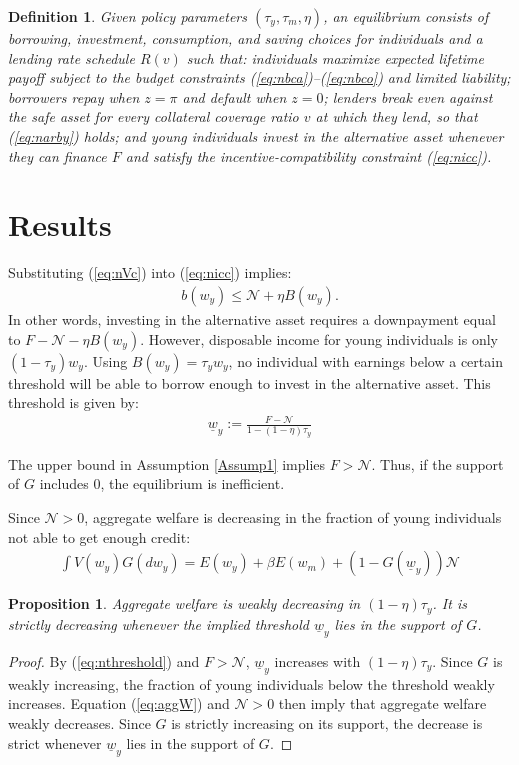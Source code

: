 \documentclass[draft,pdftex,nolinenumbers,noinfoline]{article}
\theoremstyle{plain}
\newtheorem{prp}{Proposition}
\newtheorem{dfn}{Definition}
\begin{document}
\begin{dfn}
Given policy parameters $(\tau_y,\tau_m,\eta)$, an equilibrium consists of borrowing, investment, consumption, and saving choices for individuals and a lending rate schedule $R(v)$ such that: individuals maximize expected lifetime payoff subject to the budget constraints (\ref{eq:nbca})--(\ref{eq:nbco}) and limited liability; borrowers repay when $z=\pi$ and default when $z=0$; lenders break even against the safe asset for every collateral coverage ratio $v$ at which they lend, so that (\ref{eq:narby}) holds; and young individuals invest in the alternative asset whenever they can finance $F$ and satisfy the incentive-compatibility constraint (\ref{eq:nicc}).
\end{dfn}

\section{Results}\label{sec:results}

Substituting (\ref{eq:nVc}) into (\ref{eq:nicc}) implies:
\begin{align}\label{eq:down}
b(w_y) \leq \mathcal{N} + \eta B(w_y).
\end{align}
In other words, investing in the alternative asset requires a downpayment equal to $F - \mathcal{N} - \eta B(w_y)$. However, disposable income for young individuals is only $(1-\tau_y)w_y$. Using $B(w_y)=\tau_y w_y$, no individual with earnings below a certain threshold will be able to borrow enough to invest in the alternative asset. This threshold is given by:
\begin{align}\label{eq:nthreshold}
    \underline w_y := \frac{F  - \mathcal{N}}{1-(1 - \eta)\tau_y} 
\end{align}

The upper bound in Assumption \ref{Assump1} implies $F>\mathcal{N}$. Thus, if the support of $G$ includes 0, the equilibrium is inefficient.

Since $\mathcal{N}>0$, aggregate welfare is decreasing in the fraction of young individuals not able to get enough credit:
\begin{align}\label{eq:aggW}
\int V(w_y) G(dw_y) = E(w_y)  + \beta E(w_m )  +  \left(1-G\left(\underline w_y\right)\right)\mathcal{N}
\end{align}

\begin{prp}
Aggregate welfare is weakly decreasing in $(1-\eta)\tau_y$. It is strictly decreasing whenever the implied threshold $\underline w_y$ lies in the support of $G$.
\end{prp}
\begin{proof}
By (\ref{eq:nthreshold}) and $F>\mathcal{N}$, $\underline w_y$ increases with $(1-\eta)\tau_y$. Since $G$ is weakly increasing, the fraction of young individuals below the threshold weakly increases. Equation (\ref{eq:aggW}) and $\mathcal{N}>0$ then imply that aggregate welfare weakly decreases. Since $G$ is strictly increasing on its support, the decrease is strict whenever $\underline w_y$ lies in the support of $G$.
\end{proof}
\end{document}
